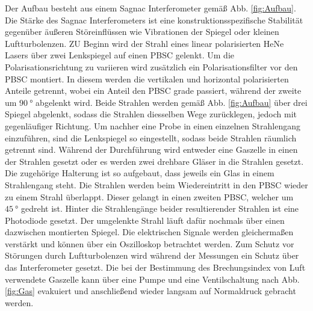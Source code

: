 Der Aufbau besteht aus einem Sagnac Interferometer gemäß Abb. \ref{fig:Aufbau}. Die Stärke des Sagnac Interferometers ist eine konstruktionsspezifische Stabilität gegenüber äußeren Störeinflüssen wie Vibrationen der Spiegel oder kleinen Luftturbolenzen. ZU Beginn wird der Strahl eines linear polarisierten HeNe Lasers über zwei Lenkspiegel auf einen PBSC gelenkt. Um die Polarisationsrichtung zu variieren wird zusätzlich ein Polarisationsfilter vor den PBSC montiert. In diesem werden die vertikalen und horizontal polarisierten Anteile getrennt, wobei ein Anteil den PBSC grade passiert, während der zweite um $\SI{90}{\degree}$ abgelenkt wird. Beide Strahlen werden gemäß Abb. \ref{fig:Aufbau} über drei Spiegel abgelenkt, sodass die Strahlen diesselben Wege zurücklegen, jedoch mit gegenläufiger Richtung. Um nachher eine Probe in einen einzelnen Strahlengang einzuführen, sind die Lenkspiegel so eingestellt, sodass beide Strahlen räumlich getrennt sind. Während der Durchführung wird entweder eine Gaszelle in einen der Strahlen gesetzt oder es werden zwei drehbare Gläser in die Strahlen gesetzt. Die zugehörige Halterung ist so aufgebaut, dass jeweils ein Glas in einem Strahlengang steht. Die Strahlen werden beim Wiedereintritt in den PBSC wieder zu einem Strahl überlappt. Dieser gelangt in einen zweiten PBSC, welcher um $\SI{45}{\degree}$ gedreht ist. Hinter die Strahlengänge beider resultierender Strahlen ist eine Photodiode gesetzt. Der umgelenkte Strahl läuft dafür nochmals über einen dazwischen montierten Spiegel. Die elektrischen Signale werden gleichermaßen verstärkt und können über ein Oszilloskop betrachtet werden. Zum Schutz vor Störungen durch Luftturbolenzen wird während der Messungen ein Schutz über das Interferometer gesetzt. Die bei der Bestimmung des Brechungsindex von Luft verwendete Gaszelle kann über eine Pumpe und eine Ventilschaltung nach Abb. \ref{fig:Gas} evakuiert und anschließend wieder langsam auf Normaldruck gebracht werden.
